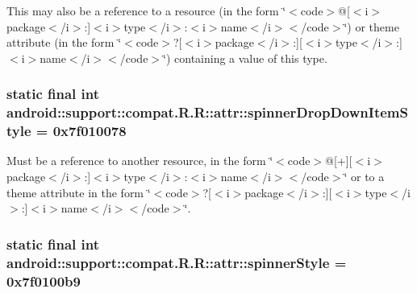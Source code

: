 This may also be a reference to a resource (in the form \char`\"{}$<$code$>$@\mbox{[}$<$i$>$package$<$/i$>$:\mbox{]}$<$i$>$type$<$/i$>$:$<$i$>$name$<$/i$>$$<$/code$>$\char`\"{}) or theme attribute (in the form \char`\"{}$<$code$>$?\mbox{[}$<$i$>$package$<$/i$>$:\mbox{]}\mbox{[}$<$i$>$type$<$/i$>$:\mbox{]}$<$i$>$name$<$/i$>$$<$/code$>$\char`\"{}) containing a value of this type. \hypertarget{classandroid_1_1support_1_1compat_1_1_r_1_1attr_95ed7add0a4d8f0b19a549bfef0f97ed}{
\subsubsection[{spinnerDropDownItemStyle}]{\setlength{\rightskip}{0pt plus 5cm}static final int android::support::compat.R.R::attr::spinnerDropDownItemStyle = 0x7f010078}}
\label{classandroid_1_1support_1_1compat_1_1_r_1_1attr_95ed7add0a4d8f0b19a549bfef0f97ed}


Must be a reference to another resource, in the form \char`\"{}$<$code$>$@\mbox{[}+\mbox{]}\mbox{[}$<$i$>$package$<$/i$>$:\mbox{]}$<$i$>$type$<$/i$>$:$<$i$>$name$<$/i$>$$<$/code$>$\char`\"{} or to a theme attribute in the form \char`\"{}$<$code$>$?\mbox{[}$<$i$>$package$<$/i$>$:\mbox{]}\mbox{[}$<$i$>$type$<$/i$>$:\mbox{]}$<$i$>$name$<$/i$>$$<$/code$>$\char`\"{}. \hypertarget{classandroid_1_1support_1_1compat_1_1_r_1_1attr_af69f19d9164d9a6a51cec8761fb691f}{
\subsubsection[{spinnerStyle}]{\setlength{\rightskip}{0pt plus 5cm}static final int android::support::compat.R.R::attr::spinnerStyle = 0x7f0100b9}}
\label{classandroid_1_1support_1_1compat_1_1_r_1_1attr_af69f19d9164d9a6a51cec8761fb691f}


